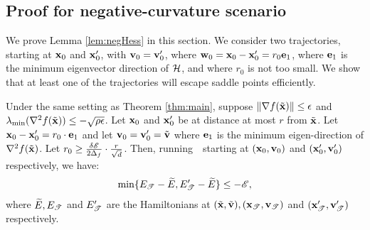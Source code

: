 
\subsection{Proof for negative-curvature scenario}
We prove Lemma \ref{lem:negHess} in this section. 
We consider two trajectories, starting at $\mathbf{x}_0$
and $\mathbf{x} '_0$, with $\mathbf{v}_0=\mathbf{v} '_0$, where $\mathbf{w}_0 =
\mathbf{x}_0 -  \mathbf{x} '_0 = r_0\mathbf{e}_1$, where $\mathbf{e}_1$ is the minimum 
eigenvector direction of $\mathcal{H}$, and where $r_0$ is not too small. 
We show that at least one of the trajectories will escape 
saddle points efficiently.

\begin{lemma}\label{lem:2nd_seq}

Under the same setting as Theorem \ref{thm:main}, suppose $\left\|{\nabla f(\tilde{\mathbf{x}})}\right\| \le \epsilon$ and $\lambda_{\min}(\nabla^2 f(\tilde{\mathbf{x}})) \le - \sqrt{\rho\epsilon}$. 
Let $\mathbf{x}_0$ and $\mathbf{x} '_0$ be at distance at most $r$ from $\tilde{\mathbf{x}}$.
Let $\mathbf{x}_0 -  \mathbf{x} '_0 = r_0 \cdot \mathbf{e}_1$ and let $\mathbf{v}_0 = \mathbf{v} '_0 = \tilde{\mathbf{v}}$ where $\mathbf{e}_1$ is the minimum eigen-direction of $\nabla^2 f(\tilde{\mathbf{x}})$. 
Let $r_0 \ge \frac{\delta\mathscr{E} }{2\Delta_f}\cdot\frac{r}{\sqrt{d}}$. 
Then, running~\nag~starting at $(\mathbf{x}_0, \mathbf{v}_0)$ and $(\mathbf{x}'_0, \mathbf{v}'_0)$ respectively, we have:
\begin{align*}
\min\{E_{\mathscr{T}} - \widetilde{E}, E '_{\mathscr{T}} - \widetilde{E}\} \le - \mathscr{E},
\end{align*}
where $\widetilde{E},E_{\mathscr{T}}$ and $E '_{\mathscr{T}}$ are the Hamiltonians at $(\tilde{\mathbf{x}}, \tilde{\mathbf{v}}), (\mathbf{x}_{\mathscr{T}}, \mathbf{v}_{\mathscr{T}})$ and $(\mathbf{x} '_{\mathscr{T}}, \mathbf{v} '_{\mathscr{T}})$ respectively.

\end{lemma}

